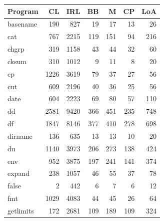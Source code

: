 \begin{table}
    \centering
    \begin{tabular}{lrrrrrr}
    \toprule 
    Program         & CL         & IRL & BB & M & CP & LoA  \\
    \midrule
    basename        & 190        & 827      & 19              & 17              & 13             & 26       \\
    cat             & 767        & 2215     & 119             & 151             & 94             & 216      \\
    chgrp           & 319        & 1158     & 43              & 44              & 32             & 60       \\
    cksum           & 310        & 1012     & 9               & 11              & 8              & 20       \\
    cp              & 1226       & 3619     & 79              & 37              & 27             & 56       \\
    cut             & 609        & 2196     & 40              & 36              & 25             & 56       \\
    date            & 604        & 2223     & 69              & 80              & 57             & 110      \\
    dd              & 2581       & 9420     & 366             & 451             & 235            & 748      \\
    df              & 1847       & 8146     & 377             & 410             & 278            & 698      \\
    dirname         & 136        & 635      & 13              & 13              & 10             & 20       \\
    du              & 1140       & 3973     & 206             & 273             & 138            & 424      \\
    env             & 952        & 3875     & 197             & 241             & 141            & 374      \\
    expand          & 238        & 1057     & 46              & 55              & 37             & 78       \\
    false           & 2          & 442      & 6               & 7               & 6              & 12       \\
    fmt             & 1029       & 4083     & 44              & 45              & 26             & 64       \\
    getlimits       & 172        & 2681     & 109             & 189             & 109            & 324      \\

\end{tabular}
\end{table}
